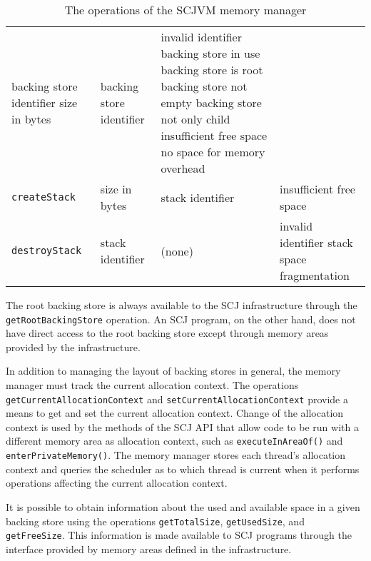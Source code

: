 \begin{table*}[ht]
\begin{tabular}{|l|p{3.2cm}|p{3.2cm}|p{5cm}|}
    backing store identifier \newline
    size in bytes &
    backing store identifier &
    invalid identifier \newline
    backing store in use \newline
    backing store is root \newline
    backing store not empty \newline
    backing store not only child \newline
    insufficient free space \newline
    no space for memory overhead
    \\\texttt{createStack} &
    size in bytes &
    stack identifier &
    insufficient free space
    \\\texttt{destroyStack} &
    stack identifier &
    (none) &
    invalid identifier \newline
    stack space fragmentation
  \end{tabular}
  \caption{The operations of the SCJVM memory manager}
  \label{memory-manager-table}
\end{table*}

The root backing store is always available to the SCJ infrastructure
through the \texttt{get\-Root\-Backing\-Store} operation.
An SCJ program, on the other hand, does not have direct access to the
root backing store except through memory areas provided by the
infrastructure.

In addition to managing the layout of backing stores in general, the
memory manager must track the current allocation context.
The operations \texttt{get\-Current\-Allocation\-Context} and
\texttt{set\-Current\-Allocation\-Context} provide a means to
get and set the current allocation context.
Change of the allocation context is used by the methods of the SCJ API
that allow code to be run with a different memory area as allocation
context, such as \texttt{execute\-In\-Area\-Of()} and
\texttt{enter\-Private\-Memory()}.
The memory manager stores each thread's allocation context and queries
the scheduler as to which thread is current when it performs
operations affecting the current allocation context.

It is possible to obtain information about the used and available
space in a given backing store using the operations
\texttt{get\-Total\-Size}, \texttt{get\-Used\-Size}, and
\texttt{get\-Free\-Size}.
This information is made available to SCJ programs through the
interface provided by memory areas defined in the infrastructure.

